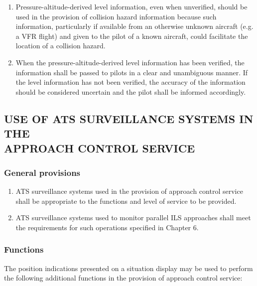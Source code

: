 \begin{enumerate}
    \item Pressure-altitude-derived level information, even when unverified, should be used in the provision of collision hazard information because such information, particularly if available from an otherwise unknown aircraft (e.g. a VFR flight) and given to the pilot of a known aircraft, could facilitate the location of a collision hazard.
    \item When the pressure-altitude-derived level information has been verified, the information shall be passed to pilots in a clear and unambiguous manner. If the level information has not been verified, the accuracy of the information should be considered uncertain and the pilot shall be informed accordingly.
\end{enumerate}


\subsection[Use of ATS surveillance systems in the approach control service]{USE OF ATS SURVEILLANCE SYSTEMS IN THE \\ APPROACH CONTROL SERVICE}

\subsubsection{General provisions}

\begin{enumerate}
    \item ATS surveillance systems used in the provision of approach control service shall be appropriate to the functions and level of service to be provided.
    \item ATS surveillance systems used to monitor parallel ILS approaches shall meet the requirements for such operations specified in Chapter 6.
\end{enumerate}

\subsubsection{Functions}

The position indications presented on a situation display may be used to perform the following additional functions in the provision of approach control service:

